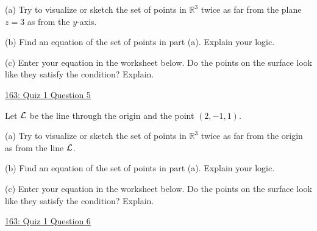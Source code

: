 \documentclass{ximera}
\begin{document}
\begin{question}  \label{Qpdfterwer032}
(a) Try to visualize or sketch the set of points in $\mathbb{R}^3$  twice as far from the plane $z=3$ as from the $y$-axis. 

(b) Find an equation of the set of points in part (a). Explain your logic.

(c) Enter  your equation in the worksheet below. Do the points on the surface look like they satisfy the condition? Explain.

\begin{onlineOnly}
    \begin{center}
\end{center}
\end{onlineOnly}

\href{https://www.desmos.com/3d/qvin80o05t}{163: Quiz 1 Question 5}
\end{question}

\begin{question}  \label{Q435tt432}
Let ${\cal L}$ be the line through the origin and the point $(2,-1,1)$.

(a) Try to visualize or sketch the set of points in $\mathbb{R}^3$  twice as far from the origin as from the line ${\cal L}$.

(b) Find an equation of the set of points in part (a). Explain your logic.

(c) Enter  your equation in the worksheet below. Do the points on the surface look like they satisfy the condition? Explain.

\begin{onlineOnly}
    \begin{center}
\end{center}
\end{onlineOnly}

\href{https://www.desmos.com/3d/wzv6plrbe6}{163: Quiz 1 Question 6}
\end{question}
\end{document}
